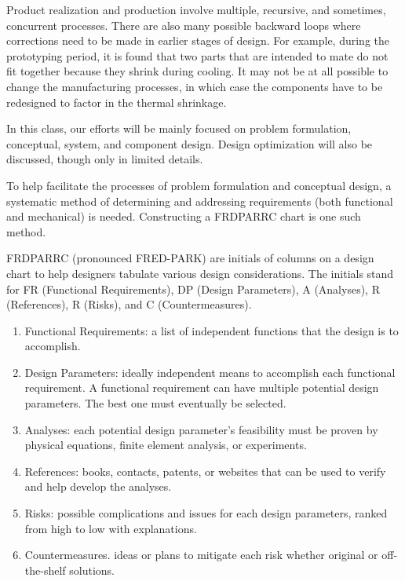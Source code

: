 \documentclass[a4paper,openany,12pt]{book}
\begin{document}
Product realization and production involve multiple, recursive, and
sometimes, concurrent processes. There are also many possible backward
loops where corrections need to be made in earlier stages of design. For
example, during the prototyping period, it is found that two parts that
are intended to mate do not fit together because they shrink during
cooling. It may not be at all possible to change the manufacturing
processes, in which case the components have to be redesigned to factor
in the thermal shrinkage.

In this class, our efforts will be mainly focused on problem
formulation, conceptual, system, and component design. Design
optimization will also be discussed, though only in limited details.

To help facilitate the processes of problem formulation and conceptual
design, a systematic method of determining and addressing requirements
(both functional and mechanical) is needed. Constructing a FRDPARRC
chart is one such method.

FRDPARRC (pronounced FRED-PARK) are initials of columns on a design
chart to help designers tabulate various design considerations. The
initials stand for FR (Functional Requirements), DP (Design Parameters),
A (Analyses), R (References), R (Risks), and C (Countermeasures).

\begin{enumerate}
\item Functional Requirements: a list of independent functions that the
design is to accomplish.

\item Design Parameters: ideally independent means to accomplish each
functional requirement. A functional requirement can have multiple
potential design parameters. The best one must eventually be
selected.

\item Analyses: each potential design parameter's feasibility must be
proven by physical equations, finite element analysis, or
experiments.

\item References: books, contacts, patents, or websites that can be used to
verify and help develop the analyses.

\item Risks: possible complications and issues for each design parameters,
ranked from high to low with explanations.

\item Countermeasures. ideas or plans to mitigate each risk whether
original or off-the-shelf solutions.
\end{enumerate}
\end{document}
